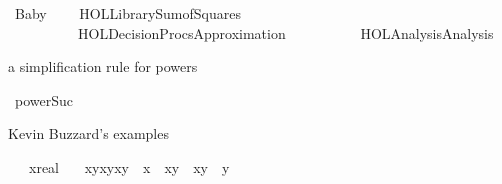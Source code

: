 %
\begin{isabellebody}%
%
%
\isadelimdocument
%
\endisadelimdocument
%
\isatagdocument
%
\isamarkuptrue%
%
\endisatagdocument
{\isafolddocument}%
%
\isadelimdocument
%
\endisadelimdocument
%
\isadelimtheory
%
\endisadelimtheory
%
\isatagtheory
{}\isamarkupfalse%
\ Baby\ \isanewline
\ \ \ {\isachardoublequoteopen}HOL{\isacharminus}{\kern0pt}Library{\isachardot}{\kern0pt}Sum{\isacharunderscore}{\kern0pt}of{\isacharunderscore}{\kern0pt}Squares{\isachardoublequoteclose}\ \isanewline
\ \ \ \ \ \ \ \ \ \ {\isachardoublequoteopen}HOL{\isacharminus}{\kern0pt}Decision{\isacharunderscore}{\kern0pt}Procs{\isachardot}{\kern0pt}Approximation{\isachardoublequoteclose}\isanewline
\ \ \ \ \ \ \ \ \ \ {\isachardoublequoteopen}HOL{\isacharminus}{\kern0pt}Analysis{\isachardot}{\kern0pt}Analysis{\isachardoublequoteclose}\isanewline
\isanewline
{}%
\endisatagtheory
{\isafoldtheory}%
%
\isadelimtheory
%
\endisadelimtheory
%
\begin{isamarkuptext}%
a simplification rule for powers%
\end{isamarkuptext}\isamarkuptrue%
\isamarkupfalse%
\ power{\isacharunderscore}{\kern0pt}Suc%
\begin{isamarkuptext}%
Kevin Buzzard's examples%
\end{isamarkuptext}\isamarkuptrue%
\isamarkupfalse%
\isanewline
\ \ \ x{\isacharcolon}{\kern0pt}{\isacharcolon}{\kern0pt}real\isanewline
\ \ \ {\isachardoublequoteopen}{\isacharparenleft}{\kern0pt}x{\isacharplus}{\kern0pt}y{\isacharparenright}{\kern0pt}{\isacharasterisk}{\kern0pt}{\isacharparenleft}{\kern0pt}x{\isacharplus}{\kern0pt}{}{\isacharasterisk}{\kern0pt}y{\isacharparenright}{\kern0pt}{\isacharasterisk}{\kern0pt}{\isacharparenleft}{\kern0pt}x{\isacharplus}{\kern0pt}{}{\isacharasterisk}{\kern0pt}y{\isacharparenright}{\kern0pt}\ {\isacharequal}{\kern0pt}\ x{\isacharcircum}{\kern0pt}{}\ {\isacharplus}{\kern0pt}\ {}{\isacharasterisk}{\kern0pt}x{\isacharcircum}{\kern0pt}{}{\isacharasterisk}{\kern0pt}y\ {\isacharplus}{\kern0pt}\ {}{}{\isacharasterisk}{\kern0pt}x{\isacharasterisk}{\kern0pt}y{\isacharcircum}{\kern0pt}{}\ {\isacharplus}{\kern0pt}\ {}{\isacharasterisk}{\kern0pt}y{\isacharcircum}{\kern0pt}{}{\isachardoublequoteclose}\isanewline
%
\isadelimproof

\end{isabellebody}
